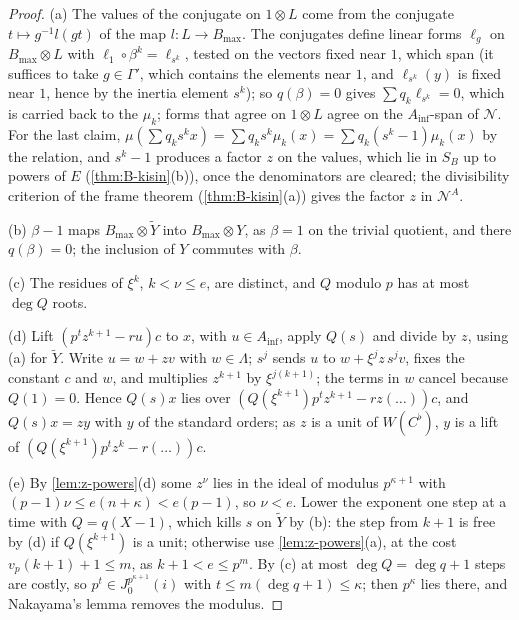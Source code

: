 \begin{proof}
(a) The values of the conjugate on $1\otimes L$ come from the conjugate $t\mapsto g^{-1}l(gt)$ of the map $l\colon L\to B_{\max}$. The conjugates define linear forms $\ell_g$ on $B_{\max}\otimes L$ with $\ell_1\circ\beta^k=\ell_{s^k}$, tested on the vectors fixed near $1$, which span (it suffices to take $g\in\Gamma'$, which contains
the elements near $1$, and $\ell_{s^k}(y)$ is fixed near $1$, hence by the inertia element $s^k$); so $q(\beta)=0$ gives $\sum q_k\ell_{s^k}=0$, which is carried back to the $\mu_k$; forms that agree on $1\otimes L$ agree on the $A_{\inf}$-span of $\mathcal N$. For the last claim, $\mu(\sum q_ks^kx)=\sum q_ks^k\mu_k(x)=\sum q_k(s^k-1)\mu_k(x)$
by the relation, and $s^k-1$ produces a factor $z$ on the values, which lie in $S_B$ up to powers of $E$ (\cref{thm:B-kisin}(b)), once the denominators are cleared; the divisibility criterion of the frame theorem (\cref{thm:B-kisin}(a)) gives the factor $z$ in $\mathcal N^A$.

(b) $\beta-1$ maps $B_{\max}\otimes\tilde Y$ into $B_{\max}\otimes Y$, as $\beta=1$ on the trivial quotient, and there $q(\beta)=0$; the inclusion of $Y$ commutes with $\beta$.

(c) The residues of $\xi^k$, $k<\nu\le e$, are distinct, and $Q$ modulo $p$ has at most $\deg Q$ roots.

(d) Lift $(p^tz^{k+1}-ru)c$ to $x$, with $u\in A_{\inf}$, apply $Q(s)$ and divide by $z$, using (a) for $\tilde Y$. Write $u=w+zv$ with $w\in\Lambda$; $s^j$ sends $u$ to $w+\xi^jz\,s^jv$, fixes the constant $c$ and $w$, and multiplies $z^{k+1}$ by $\xi^{j(k+1)}$; the terms in $w$ cancel because $Q(1)=0$. Hence $Q(s)x$ lies over
$(Q(\xi^{k+1})p^tz^{k+1}-rz(\dots))c$, and $Q(s)x=zy$ with $y$ of the standard orders; as $z$ is a unit of $W(C^\flat)$, $y$ is a lift of $(Q(\xi^{k+1})p^tz^k-r(\dots))c$.

(e) By \cref{lem:z-powers}(d) some $z^\nu$ lies in the ideal of modulus $p^{\kappa+1}$ with $(p-1)\nu\le e(n+\kappa)<e(p-1)$, so $\nu<e$. Lower the exponent one step at a time with $Q=q(X-1)$, which kills $s$ on $\tilde Y$ by (b): the step from $k+1$ is free by (d) if $Q(\xi^{k+1})$ is a unit; otherwise use \cref{lem:z-powers}(a), at the
cost $v_p(k+1)+1\le m$, as $k+1<e\le p^m$. By (c) at most $\deg Q=\deg q+1$ steps are costly, so $p^t\in J^{p^{\kappa+1}}_0(i)$ with $t\le m(\deg q+1)\le\kappa$; then $p^\kappa$ lies there, and Nakayama's lemma removes the modulus.


\end{proof}
